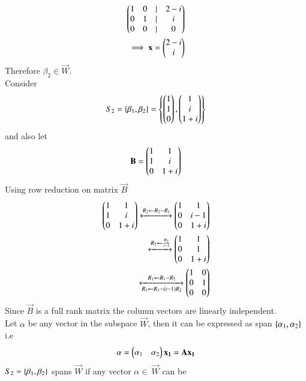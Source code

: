 \documentclass[journal,12pt,twocolumn]{IEEEtran}
\begin{document}
\begin{enumerate}[label=\emph{\alph*)}]
\begin{align}
                        \begin{pmatrix}1 & 0 &  | & 2-i \\
                               0 & 1   &| & i \\
                               0 & 0  & | & 0 \end{pmatrix} \\
                               \implies
                               \mathbf{x}=\begin{pmatrix}2-i\\i\end{pmatrix}
		\end{align}
Therefore $\beta_2 \in \vec{W}$.\\
Consider 
\begin{align}
	S_2=\left\{\beta_1,\beta_2\right\}=\left\{\begin{pmatrix}1\\1\\0\end{pmatrix},\begin{pmatrix}1\\i\\1+i\end{pmatrix}\right\}
\end{align}
and also let 
\begin{align}
	\mathbf{B}=\begin{pmatrix}1 & 1 \\
		       1 & i \\
		       0 & 1+i\end{pmatrix}
\end{align}
Using row reduction on matrix $\vec{B}$
\begin{align}
	\myvec{1 & 1 \\
               1 & i \\
               0 & 1+i}
        \xleftrightarrow[]{R_2 \leftarrow R_2-R_1}
	\myvec{1 & 1 \\
               0 & i-1 \\
	       0 & 1+i}\\
	\xleftrightarrow[]{R_2\leftarrow \frac{R_2}{i-1}}
	\myvec{1 & 1 \\
               0 & 1 \\
               0 & 1+i}\\
	\xleftrightarrow[R_3 \leftarrow R_3-(i-1)R_2]
	{R_1 \leftarrow R_1 - R_2}
	 \myvec{1 & 0 \\ 0 & 1 \\ 0 & 0} \label{Binv}
\end{align}
Since $\vec{B}$ is a full rank matrix the column vectors are linearly independent.\\
Let $\alpha$ be any vector in the subspace $\vec{W}$, then it can be expressed as 
span $\left\{\alpha_1,\alpha_2\right\}$ i.e
\begin{align}
	\alpha = \myvec{\alpha_1 & \alpha_2}\vec{x_1} =\vec{A}\vec{x_1} \label{Ax}
\end{align}
$S_2=\left\{\beta_1,\beta_2\right\}$ spans $\vec{W}$ if any vector $\alpha \in \ \vec{W}$ can be 

\end{enumerate}
\end{document}

